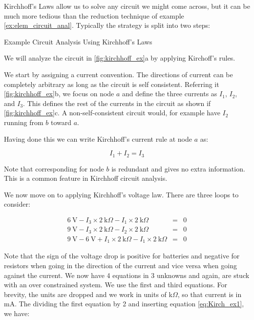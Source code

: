 \documentclass{tufte-book}
\begin{document}
Kirchhoff's Laws allow us to solve any circuit we might come across, but it can be much more tedious than the reduction technique of example \ref{ex:elem_circuit_anal}. Typically the strategy is split into two steps:

\begin{myexample}[label = ex:kirchhoff_calculation]{Example Circuit Analysis Using Kirchhoff's Laws}

We will analyze the circuit in \ref{fig:kirchhoff_ex}a by applying Kirchoff's rules. 

\noindent We start by assigning a current convention. The directions of current can be completely arbitrary as long as the circuit is self consistent. Referring it \ref{fig:kirchhoff_ex}b, we focus on node $a$ and define the three currents as $I_1$, $I_2$, and $I_3$. This defines the rest of the currents in the circuit as shown if \ref{fig:kirchhoff_ex}c. A non-self-consistent circuit would, for example have $I_2$ running from $b$ toward $a$. 

Having done this we can write Kirchhoff's current rule at node $a$ as:

\begin{equation}\label{eq:Kirch_ex1}
I_1+I_2 = I_3
\end{equation}

\noindent Note that corresponding for node $b$ is redundant and gives no extra information. This is a common feature in Kirchhoff circuit analysis.

We now move on to applying Kirchhoff's voltage law. There are three loops to consider:

\begin{eqnarray}\label{eq:Kirch_ex2}
6~\text{V} - I_3\times2~\text{k}\Omega - I_1\times2~\text{k}\Omega &=& 0 \nonumber\\
9~\text{V} - I_3\times2~\text{k}\Omega - I_2\times2~\text{k}\Omega &=& 0 \nonumber\\
9~\text{V}-6~\text{V} +I_1\times2~\text{k}\Omega - I_1\times2~\text{k}\Omega &=& 0 
\end{eqnarray}


\noindent Note that the sign of the voltage drop is positive for batteries and negative for resistors when going in the direction of the current and vice versa when going against the current. We now have 4 equations in 3 unknowns and again, are stuck with an over constrained system. We use the first and third equations. For brevity, the units are dropped and we work in units of k$\Omega$, so that current is in mA. The dividing the first equation by 2 and inserting equation \ref{eq:Kirch_ex1}, we have:


\end{myexample}
\end{document}
